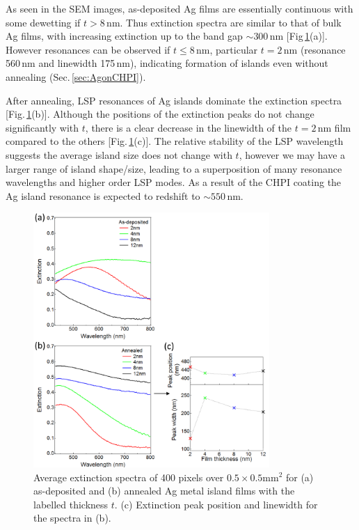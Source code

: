 As seen in the SEM images, as-deposited Ag films are essentially continuous with some dewetting if $t>8$\,nm. Thus extinction spectra are similar to that of bulk Ag films, with increasing extinction up to the band gap $\sim300$\,nm [Fig\,\ref{6Fig6}(a)]. However resonances can be observed if $t\leq8$\,nm, particular $t=2$\,nm (resonance 560\,nm and linewidth 175\,nm), indicating formation of islands even without annealing (Sec.\,\ref{sec:AgonCHPI}). 

After annealing, LSP resonances of Ag islands dominate the extinction spectra [Fig.\,\ref{6Fig6}(b)]. Although the positions of the extinction peaks do not change significantly with $t$, there is a clear decrease in the linewidth of the $t=2$\,nm film compared to the others [Fig.\,\ref{6Fig6}(c)]. The relative stability of the LSP wavelength suggests the average island size does not change with $t$, however we may have a larger range of island shape/size, leading to a superposition of many resonance wavelengths and higher order LSP modes. As a result of the CHPI coating the Ag island resonance is expected to redshift to $\sim550$\,nm.
\begin{figure}[h!] 
\centering    
\includegraphics[width=0.8\textwidth]{Fig6}
\caption{Average extinction spectra of 400 pixels over $0.5\times0.5$mm$^2$ for (a) as-deposited and (b) annealed Ag metal island films with the labelled thickness $t$. (c) Extinction peak position and linewidth for the spectra in (b).}
\label{6Fig6}
\end{figure}

